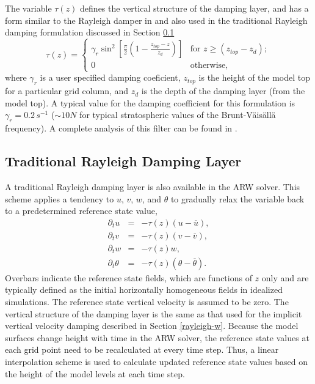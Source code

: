 The variable $\tau(z)$ defines the vertical structure of the damping
layer, and has a form similar to the Rayleigh damper in
\citet{durran_klemp83} and also used in the traditional Rayleigh damping
formulation discussed in Section \ref{traditional-rayleigh}
%
\[ \tau (z) = \left\{ \begin{array}{cc}
         \gamma_r\sin^2 \left[ \frac{\pi}{2} 
\left( 1 - \frac{z_{top}-z}{z_d} \right) \right] & 
\mbox{for $z \geq (z_{top}-z_d)$};\\ 
        0 & \mbox{otherwise}, \end{array} \right. \] 
%
where $\gamma_r$ is a user specified damping coeficient, $z_{top}$ is
the height of the model top for a particular grid column, and $z_d$ is
the depth of the damping layer (from the model top).  A typical value
for the damping coefficient for this formulation is 
$\gamma_r = 0.2 \,s^{-1}$ ($\sim 10N$ for typical stratospheric values of
the Brunt-V\"ais\"all\"a frequency).
A complete
analysis of this filter can be found in \citet{klemp_et_al_2008}.

\subsection{Traditional Rayleigh Damping Layer}
\label{traditional-rayleigh}

A traditional Rayleigh damping layer is also available in the ARW solver.  This
scheme applies a tendency to $u$, $v$, $w$, and $\theta$ to gradually
relax the variable back to a predetermined reference state value,
%
\begin{eqnarray*}
   {\partial_t u        } & = & -\tau (z) \left( u - \overline{u} \right) ,\\
   {\partial_t v        } & = & -\tau (z) \left( v - \overline{v} \right) ,\\
   {\partial_t w       } & = & -\tau (z)        w                        ,\\
   {\partial_t \theta} & = & -\tau (z) \left( \theta - \overline{\theta} \right).
\end{eqnarray*}
%
Overbars indicate the reference state fields, which are functions of $z$
only and are typically defined as the initial horizontally homogeneous
fields in idealized simulations.  The reference state vertical velocity
is assumed to be zero.  The vertical structure of the damping layer is
the same as that used for the implicit vertical velocity damping
described in Section \ref{rayleigh-w}.
Because the model surfaces change height with time in the ARW solver, the
reference state values at each grid point need to be recalculated at
every time step.  Thus, a linear interpolation scheme is used to
calculate updated reference state values based on the height of the
model levels at each time step.

